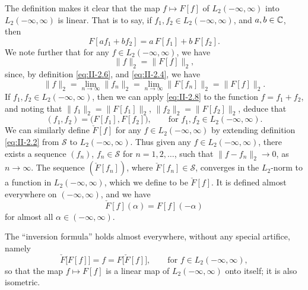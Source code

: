 The definition makes it clear that the map $f\mapsto F[f]$ of $L_{2}(-\infty,\infty)$ into $L_{2}(-\infty,\infty)$ is linear. That is to say, if $f_{1},f_{2}\in L_{2}(-\infty,\infty)$, and $a,b\in\mathbb{C}$, then
\begin{equation}\tag{2.7}\label{eq:II-2.7}
F[a f_{1}+b f_{2}]=a\,F[f_{1}]+b\,F[f_{2}].
\end{equation}
We note further that for any $f\in L_{2}(-\infty,\infty)$, we have
\begin{equation}\tag{2.8}\label{eq:II-2.8}
\|f\|_{2}=\|F[f]\|_{2},
\end{equation}
since, by definition \eqref{eq:II-2.6}, and \eqref{eq:II-2.4}, we have
\begin{equation}\tag{2.9}\label{eq:II-2.9}
\|f\|_{2}=\lim_{n\to\infty}\|f_{n}\|_{2}
=\lim_{n\to\infty}\|F[f_{n}]\|_{2}=\|F[f]\|_{2}.
\end{equation}
If $f_{1},f_{2}\in L_{2}(-\infty,\infty)$, then we can apply \eqref{eq:II-2.8} to the function $f=f_{1}+f_{2}$, and noting that $\|f_{1}\|_{2}=\|F[f_{1}]\|_{2}$, $\|f_{2}\|_{2}=\|F[f_{2}]\|_{2}$, deduce that
\begin{equation}\tag{2.10}\label{eq:II-2.10}
(f_{1},f_{2})=\bigl(F[f_{1}],F[f_{2}]\bigr),\qquad\text{for }f_{1},f_{2}\in L_{2}(-\infty,\infty).
\end{equation}
We can similarly define $\check F[f]$ for any $f\in L_{2}(-\infty,\infty)$ by extending definition \eqref{eq:II-2.2} from $\mathcal S$ to $L_{2}(-\infty,\infty)$. Thus given any $f\in L_{2}(-\infty,\infty)$, there exists a sequence $(f_{n})$, $f_{n}\in\mathcal S$ for $n=1,2,\dots$, such that $\|f-f_{n}\|_{2}\to 0$, as $n\to\infty$. The sequence $(\check F[f_{n}])$, where $\check F[f_{n}]\in\mathcal S$, converges in the $L_{2}$-norm to a function in $L_{2}(-\infty,\infty)$, which we define to be $\check F[f]$. It is defined almost everywhere on $(-\infty,\infty)$, and we have
\begin{equation}\tag{2.11}\label{eq:II-2.11}
\check F[f](\alpha)=F[f](-\alpha)
\end{equation}
for almost all $\alpha\in(-\infty,\infty)$.

The ``inversion formula'' holds almost everywhere, without any special artifice, namely
\begin{equation*}\tag{2.11}\label{eq:II-2.11b}
\check F\bigl[F[f]\bigr]=f=F\bigl[\check F[f]\bigr],\qquad\text{for }f\in L_{2}(-\infty,\infty),
\end{equation*}
so that the map $f\mapsto F[f]$ is a linear map of $L_{2}(-\infty,\infty)$ onto itself; it is also isometric.


